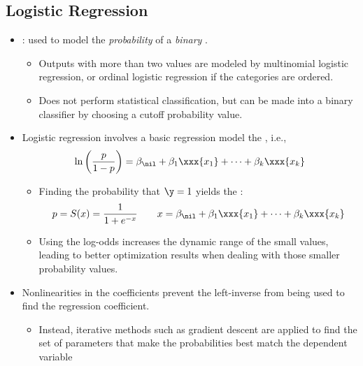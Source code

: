 \begin{itemize}
  \subsection{Logistic Regression}
  \begin{itemize}
    \item {}: used to model the \emph{probability} of a \emph{binary} .
      \begin{itemize}
        \item Outputs with more than two values are modeled by multinomial logistic regression, or ordinal logistic regression if the categories are ordered.
        \item Does not perform statistical classification, but can be made into a binary classifier by choosing a cutoff probability value.
      \end{itemize}
    \item Logistic regression involves a basic regression model the , i.e.,
    \[%
    \ln\left(\frac{p}{1-p}\right) = \beta_\nil + \beta_1\xxx{x_1} + \cdots + \beta_k\xxx{x_k}
    \]%
      \begin{itemize}
        \item Finding the probability that \(\y = 1\) yields the :
        \[%
        p = S(x) = \frac{1}{1+e^{-x}} \qquad x = \beta_\nil + \beta_1\xxx{x_1} + \cdots + \beta_k\xxx{x_k}
        \]%
        \item Using the log-odds increases the dynamic range of the small values, leading to better optimization results when dealing with those smaller probability values.
      \end{itemize}
    \item Nonlinearities in the coefficients prevent the left-inverse from being used to find the regression coefficient.
      \begin{itemize}
        \item Instead, iterative methods such as gradient descent are applied to find the set of parameters that make the probabilities best match the dependent variable
      \end{itemize}
  \end{itemize}


\end{itemize}
